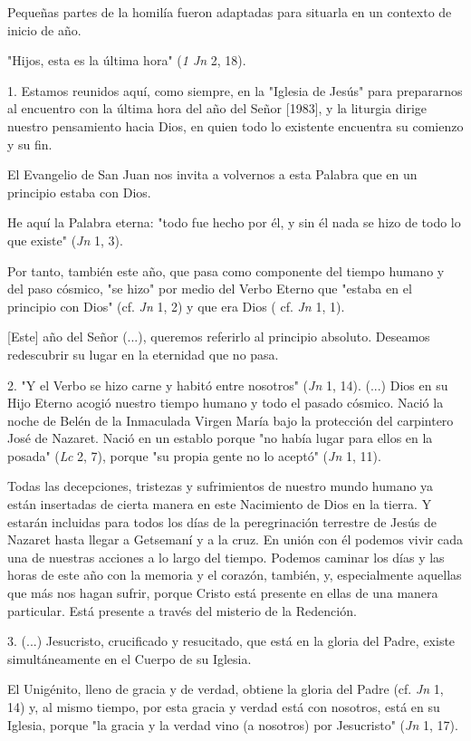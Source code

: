 \begin{body}
Pequeñas partes de la homilía fueron adaptadas para situarla en un contexto de inicio de año.

"Hijos, esta es la última hora" (\emph{1 Jn} 2, 18).

1. Estamos reunidos aquí, como siempre, en la "Iglesia de Jesús" para prepararnos al encuentro con la última hora del año del Señor {[}1983{]}, y la liturgia dirige nuestro pensamiento hacia Dios, en quien todo lo existente encuentra su comienzo y su fin.

El Evangelio de San Juan nos invita a volvernos a esta Palabra que en un principio estaba con Dios.

He aquí la Palabra eterna: "todo fue hecho por él, y sin él nada se hizo de todo lo que existe" (\emph{Jn} 1, 3).

Por tanto, también este año, que pasa como componente del tiempo humano y del paso cósmico, "se hizo" por medio del Verbo Eterno que "estaba en el principio con Dios" (cf. \emph{Jn} 1, 2) y que era Dios ( cf. \emph{Jn} 1, 1).

{[}Este{]} año del Señor (...), queremos referirlo al principio absoluto. Deseamos redescubrir su lugar en la eternidad que no pasa.

2. "Y el Verbo se hizo carne y habitó entre nosotros" (\emph{Jn} 1, 14). (...) Dios en su Hijo Eterno acogió nuestro tiempo humano y todo el pasado cósmico. Nació la noche de Belén de la Inmaculada Virgen María bajo la protección del carpintero José de Nazaret. Nació en un establo porque "no había lugar para ellos en la posada" (\emph{Lc} 2, 7), porque "su propia gente no lo aceptó" (\emph{Jn} 1, 11).

Todas las decepciones, tristezas y sufrimientos de nuestro mundo humano ya están insertadas de cierta manera en este Nacimiento de Dios en la tierra. Y estarán incluidas para todos los días de la peregrinación terrestre de Jesús de Nazaret hasta llegar a Getsemaní y a la cruz. En unión con él podemos vivir cada una de nuestras acciones a lo largo del tiempo. Podemos caminar los días y las horas de este año con la memoria y el corazón, también, y, especialmente aquellas que más nos hagan sufrir, porque Cristo está presente en ellas de una manera particular. Está presente a través del misterio de la Redención.

3. (...) Jesucristo, crucificado y resucitado, que está en la gloria del Padre, existe simultáneamente en el Cuerpo de su Iglesia.

El Unigénito, lleno de gracia y de verdad, obtiene la gloria del Padre (cf. \emph{Jn} 1, 14) y, al mismo tiempo, por esta gracia y verdad está con nosotros, está en su Iglesia, porque "la gracia y la verdad vino (a nosotros) por Jesucristo" (\emph{Jn} 1, 17).


\end{body}
